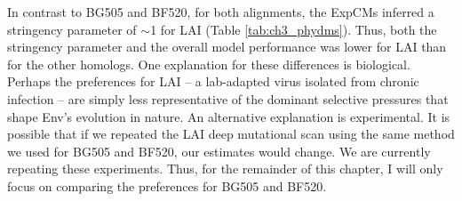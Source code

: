 \documentclass[9pt,lineno]{elife}
\begin{document}
In contrast to BG505 and BF520, for both alignments, the ExpCMs inferred a stringency parameter of $\sim$1 for LAI (Table \ref{tab:ch3_phydms}).
Thus, both the stringency parameter and the overall model performance was lower for LAI than for the other homologs.
One explanation for these differences is biological.
Perhaps the preferences for LAI -- a lab-adapted virus isolated from chronic infection -- are simply less representative of the dominant selective pressures that shape Env's evolution in nature.
An alternative explanation is experimental.
It is possible that if we repeated the LAI deep mutational scan using the same method we used for BG505 and BF520, our estimates would change.
We are currently repeating these experiments.
Thus, for the remainder of this chapter, I will only focus on comparing the preferences for BG505 and BF520.
\end{document}
